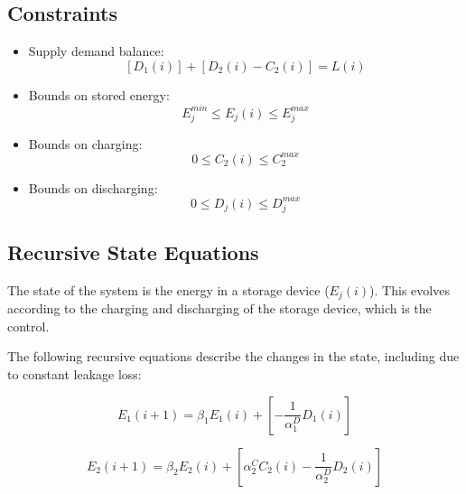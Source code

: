 \documentclass{article}
\begin{document}
	\subsection{Constraints}
	\begin{itemize}
		\item Supply demand balance: 
		\begin{equation} \left[D_{1}(i)\right] + \left[D_{2}(i) - C_{2}(i)\right] = L(i) \end{equation}
						
		\item Bounds on stored energy: 
		\begin{equation}E_{j}^{min}\leq E_{j}(i)\leq E_{j}^{max}\end{equation}
		\item Bounds on charging:
		\begin{equation}0\leq C_{2}(i)\leq C_{2}^{max}\end{equation}
		\item Bounds on discharging:
		\begin{equation}0\leq D_{j}(i)\leq D_{j}^{max}\end{equation}
	\end{itemize}

	\subsection{Recursive State Equations}
	 The state of the system is the energy in a storage device ($E_{j}(i)$). This evolves according to the charging and discharging of the storage device, which is the control.
	 
	 The following recursive equations describe the changes in the state, including due to constant leakage loss:
	 
	 \begin{equation}\label{eq:StateEq1}E_{1}(i+1)=\beta_{1}E_{1}(i)+\left[-\frac{1}{\alpha_{1}^{D}}D_{1}(i)\right] \end{equation}
	 
	 \begin{equation}\label{eq:StateEq2}E_{2}(i+1)=\beta_{2}E_{2}(i)+\left[\alpha_{2}^{C}C_{2}(i)-\frac{1}{\alpha_{2}^{D}}D_{2}(i)\right]\end{equation} 
	 
\end{document}
